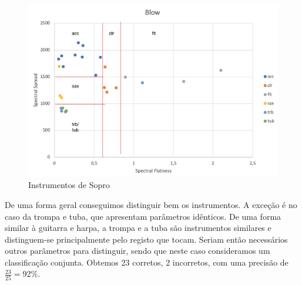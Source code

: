 \begin{figure}[H]
    \centering
    \includegraphics[width=.8\linewidth]{figs/comp_3.png}
    \caption{Instrumentos de Sopro}
    \label{fig:9}
\end{figure}

De uma forma geral conseguimos distinguir bem os instrumentos. 
A exceção é no caso da trompa e tuba, que apresentam parâmetros idênticos.
De uma forma similar à guitarra e harpa, a trompa e a tuba são instrumentos similares e distinguem-se principalmente pelo registo que tocam.
Seriam então necessários outros parâmetros para distinguir, sendo que neste caso consideramos um classificação conjunta.
Obtemos 23 corretos, 2 incorretos, com uma precisão de $\frac{23}{25} = 92\%$.






